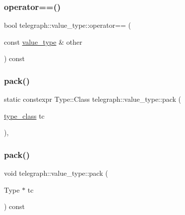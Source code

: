 \mbox{\label{classtelegraph_1_1value__type_a9a30339ab46ea67c279414318ecf041d}} 
\subsubsection{\texorpdfstring{operator==()}{operator==()}}
{\footnotesize\ttfamily bool telegraph\+::value\+\_\+type\+::operator== (\begin{DoxyParamCaption}\item[{const \hyperlink{classtelegraph_1_1value__type}{value\+\_\+type} \&}]{other }\end{DoxyParamCaption}) const\hspace{0.3cm}{\ttfamily [inline]}}

\mbox{\label{classtelegraph_1_1value__type_a7d002f4e90bf6e8dc7e1527a9cb4d894}} 
\subsubsection{\texorpdfstring{pack()}{pack()}\hspace{0.1cm}{\footnotesize\ttfamily [1/2]}}
{\footnotesize\ttfamily static constexpr Type\+::\+Class telegraph\+::value\+\_\+type\+::pack (\begin{DoxyParamCaption}\item[{\hyperlink{classtelegraph_1_1value__type_a516081c0a4e231cb22554f48f052ff6f}{type\+\_\+class}}]{tc }\end{DoxyParamCaption})\hspace{0.3cm}{\ttfamily [inline]}, {\ttfamily [static]}}

\mbox{\label{classtelegraph_1_1value__type_a34d5c460357b088d0c11497d8f93088b}} 
\subsubsection{\texorpdfstring{pack()}{pack()}\hspace{0.1cm}{\footnotesize\ttfamily [2/2]}}
{\footnotesize\ttfamily void telegraph\+::value\+\_\+type\+::pack (\begin{DoxyParamCaption}\item[{Type $\ast$}]{tc }\end{DoxyParamCaption}) const\hspace{0.3cm}{\ttfamily [inline]}}

